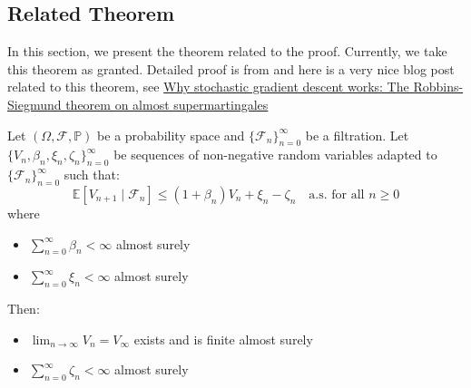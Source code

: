 \subsection{Related Theorem}
In this section, we present the theorem related to the proof. Currently, we take this theorem as granted. Detailed proof is from \cite{robbins1971convergence} and here is a very nice blog post related to this theorem, see \href{https://nrhstat.org/post/robbins_siegmund/}{Why stochastic gradient descent works: 
The Robbins-Siegmund theorem on almost supermartingales}
\begin{theorem}\label{thm:robbins siegmund}
Let $(\Omega, \mathcal{F}, \mathbb{P})$ be a probability space and $\{\mathcal{F}_n\}_{n=0}^{\infty}$ be a filtration. Let $\{V_n,\beta_n, \xi_n, \zeta_n\}_{n=0}^\infty$ be sequences of non-negative random variables adapted to $\{\mathcal{F}_n\}_{n=0}^{\infty}$ such that:
$$
\mathbb{E}[V_{n+1} \mid \mathcal{F}_n] \leq (1+\beta_n)V_n+\xi_n-\zeta_n\quad \text{a.s. for all } n \geq 0
$$
where
\begin{itemize}
    \item $\sum_{n=0}^\infty \beta_n<\infty$ almost surely
    \item $\sum_{n=0}^\infty \xi_n<\infty$ almost surely
\end{itemize}
Then:
\begin{itemize}
    \item $\lim_{n\to\infty}V_n = V_\infty$ exists and is finite almost surely
    \item $\sum_{n=0}^\infty \zeta_n<\infty$ almost surely
\end{itemize}
\end{theorem}

